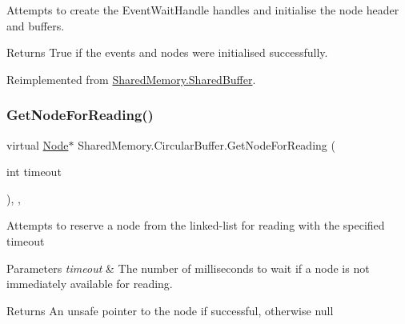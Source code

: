 Attempts to create the Event\+Wait\+Handle handles and initialise the node header and buffers. 

\begin{DoxyReturn}{Returns}
True if the events and nodes were initialised successfully.
\end{DoxyReturn}


Reimplemented from \hyperlink{class_shared_memory_1_1_shared_buffer_ae91f81f088cebf1bca375bfe0cb48d6e}{Shared\+Memory.\+Shared\+Buffer}.

\mbox{\label{class_shared_memory_1_1_circular_buffer_a2d906a5fe33490932bec3417750e5d6f}} 
\subsubsection{\texorpdfstring{Get\+Node\+For\+Reading()}{GetNodeForReading()}}
{\footnotesize\ttfamily virtual \hyperlink{struct_shared_memory_1_1_circular_buffer_1_1_node}{Node}$\ast$ Shared\+Memory.\+Circular\+Buffer.\+Get\+Node\+For\+Reading (\begin{DoxyParamCaption}\item[{int}]{timeout }\end{DoxyParamCaption})\hspace{0.3cm}{\ttfamily [inline]}, {\ttfamily [protected]}, {\ttfamily [virtual]}}



Attempts to reserve a node from the linked-\/list for reading with the specified timeout 


\begin{DoxyParams}{Parameters}
{\em timeout} & The number of milliseconds to wait if a node is not immediately available for reading.\\
\hline
\end{DoxyParams}
\begin{DoxyReturn}{Returns}
An unsafe pointer to the node if successful, otherwise null
\end{DoxyReturn}
\mbox{\label{class_shared_memory_1_1_circular_buffer_acbe3706f03284bceb02fde3b6dc2fcbe}} 

